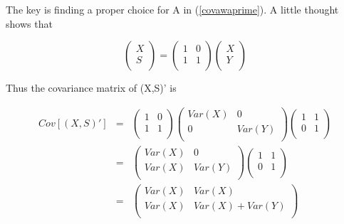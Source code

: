 The key is finding a proper choice for A in (\ref{covawaprime}).  A
little thought shows that

\begin{equation}
   \left (
   \begin{array}{r}
   X \\
   S \\
   \end{array}
   \right )
   =
   \left (
   \begin{array}{rr}
   1 & 0 \\
   1 & 1 \\
   \end{array}
   \right )
   \left (
   \begin{array}{r}
   X \\
   Y \\
   \end{array}
   \right )
\end{equation}

Thus the covariance matrix of (X,S)' is

\begin{eqnarray}
Cov[(X,S)']&=& 
   \left (
   \begin{array}{rr}
   1 & 0 \\
   1 & 1 \\
   \end{array}
   \right )
   \left (
   \begin{array}{cc}
   Var(X) & 0 \\
   0 & Var(Y) \\
   \end{array}
   \right )
   \left (
   \begin{array}{rr}
   1 & 1 \\
   0 & 1 \\
   \end{array}
   \right ) \\
&=&
   \left (
   \begin{array}{cc}
   Var(X) & 0 \\
   Var(X) & Var(Y) \\
   \end{array}
   \right )
   \left (
   \begin{array}{rr}
   1 & 1 \\
   0 & 1 \\
   \end{array}
   \right ) \\ 
&=&
   \left (
   \begin{array}{cc}
   Var(X) & Var(X) \\
   Var(X) & Var(X) + Var(Y) \\
   \end{array}
   \right )
\end{eqnarray}

